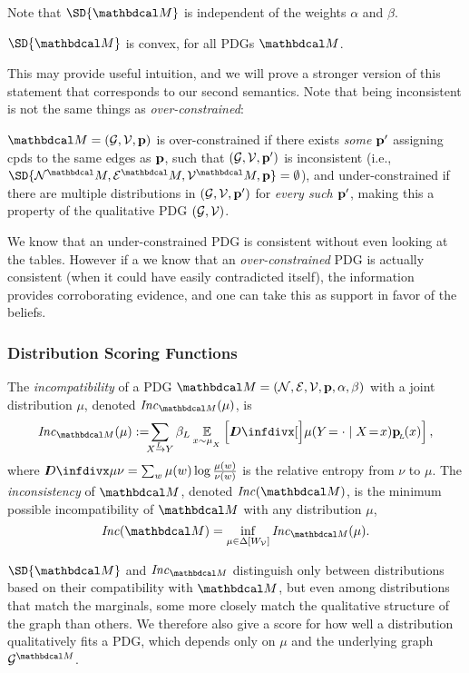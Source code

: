\documentclass{article}
\begin{document}
	Note that $\SD{\dg M}$ is independent of the weights $\alpha$ and $\beta$.

	\begin{prop}[restate=thmsetconvex] 
		\label{prop:convex}
		$\SD{\dg M}$ is convex, for all PDGs $\dg M$.
	\end{prop}
		
	This may provide useful intuition, and we will prove a stronger version of this statement that corresponds to our second semantics.
	Note that being inconsistent is not the same things as \emph{over-constrained}: 	
	\begin{defn}
		$\dg M = (\Gr,\V,\mat p)$ is over-constrained if there exists
		  \emph{some $\mathbf p'$} assigning cpds to the same edges as
		  $\mathbf p$, such that $(\mathcal G, \mathcal V, \mathbf p')$ is inconsistent
		  (i.e., $\SD{\N^\dg M, \Ed^\dg M, \V^\dg M, \mat p}
			= \emptyset$), and under-constrained if there are
		  multiple distributions in $(\mathcal G, \mathcal V, \mathbf p')$ for
		  \emph{every such $\mathbf p'$}, making this a property of the
		  qualitative PDG $(\mathcal G, \mathcal V)$.  
	\end{defn}

	We know that an under-constrained PDG is consistent without even looking at the tables. However if a we know that an \emph{over-constrained} PDG is actually consistent (when it could have easily contradicted itself), the information provides corroborating evidence, and one can take this as support in favor of the beliefs. 


	\subsubsection{Distribution Scoring Functions}\label{sec:scoring-semantics}
	\begin{defn}\label{def:inc}
		The \emph{incompatibility} of a PDG $\dg M = \pdgvars[]$ with
		a joint distribution $\mu$, denoted $\Inc_{\dg M}(\mu)$, is  
		\[
		\Inc_{\dg M }( \mu) := 
		\!\!\!\sum\alle \beta_L \Ex_{x \sim \mu_{_X}}
		\left[\kldiv[\Big]{ \mu(Y\!= \cdot\mid X \!=\! x) }{\bp(x) } \right] ,
		\]
		where $\kldiv{\mu}{\nu} = \sum_{w} \mu(w) \log\frac{\mu(w)}{\nu(w)}$ is the 
		relative entropy from $\nu$ to $\mu$.
				The \emph{inconsistency} of $\dg M$, 
			denoted $\Inc(\dg M)$, is the
			minimum possible incompatibility of $\dg M$ with any
			distribution $\mu$,  
			\[ \Inc(\dg M) = \inf_{ \mu \in \Delta [W_{\cal V}]} \Inc_{\dg M}(\mu) . \]
	\end{defn}
	$\SD{\dg M}$ and $\Inc_{\dg M}$ distinguish only
	between distributions based on their compatibility with
	$\dg M$, but even among distributions that match the
	marginals, some more closely match the qualitative structure
	of the graph than others.  
	We therefore also give a score for how well a distribution qualitatively fits
	a PDG, which depends only on $\mu$ and the underlying graph $\Gr^{\dg M}$. 
		
\end{document}
